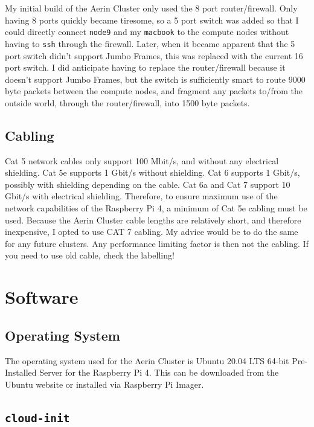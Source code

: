 \documentclass{report}
\begin{document}
My initial build of the Aerin Cluster only used the 8 port router/firewall. Only having 8 ports quickly became tiresome, so a 5 port switch was added so that I could directly connect \verb|node9| and my \verb|macbook| to the compute nodes without having to \verb|ssh| through the firewall. Later, when it became apparent that the 5 port switch didn't support Jumbo Frames, this was replaced with the current 16 port switch. I did anticipate having to replace the router/firewall because it doesn't support Jumbo Frames, but the switch is sufficiently smart to route 9000 byte packets between the compute nodes, and fragment any packets to/from the outside world, through the router/firewall, into 1500 byte packets.


%
%
\subsection{Cabling}
Cat 5 network cables only support 100 Mbit/s, and without any electrical shielding. Cat 5e supports 1 Gbit/s without shielding. Cat 6 supports 1 Gbit/s, possibly with shielding depending on the cable. Cat 6a and Cat 7 support 10 Gbit/s with electrical shielding. Therefore, to ensure maximum use of the network capabilities of the Raspberry Pi 4, a minimum of Cat 5e cabling must be used. Because the Aerin Cluster cable lengths are relatively short, and therefore inexpensive, I opted to use CAT 7 cabling. My advice would be to do the same for any future clusters. Any performance limiting factor is then not the cabling. If you need to use old cable, check the labelling!  



%
%
\section{Software}


%
%
\subsection{Operating System}
The operating system used for the Aerin Cluster is Ubuntu 20.04 LTS 64-bit Pre-Installed Server for the Raspberry Pi 4. This can be downloaded from the Ubuntu website or installed via Raspberry Pi Imager.


%
%
\subsection{\texttt{cloud-init}}
\end{document}
